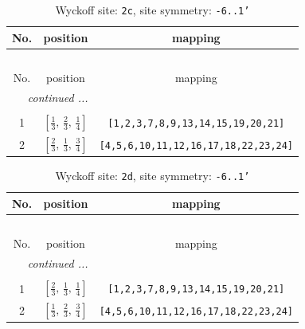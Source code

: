 \documentclass[fleqn,8pt]{jsarticle}
\begin{document}
\renewcommand{\arraystretch}{1.2}
\begin{longtable}{ccc}
\caption{Wyckoff site: {\tt 2c}, site symmetry: {\tt -6..1'}}
 \\
 \hline \hline
No. & position & mapping \\ \hline \endfirsthead

\multicolumn{2}{l}{\tablename\ \thetable{}} \\
 \hline \hline
No. & position & mapping \\ \hline \endhead

 \hline \hline
\multicolumn{2}{r}{\footnotesize\it continued ...} \\ \endfoot

 \hline \hline
\multicolumn{2}{r}{} \\ \endlastfoot

1 & $\left[ \frac{1}{3},\, \frac{2}{3},\, \frac{1}{4} \right]$ & {\tt [1,2,3,7,8,9,13,14,15,19,20,21]} \\ \hline
2 & $\left[ \frac{2}{3},\, \frac{1}{3},\, \frac{3}{4} \right]$ & {\tt [4,5,6,10,11,12,16,17,18,22,23,24]} \\
\end{longtable}
\renewcommand{\arraystretch}{1.2}
\begin{longtable}{ccc}
\caption{Wyckoff site: {\tt 2d}, site symmetry: {\tt -6..1'}}
 \\
 \hline \hline
No. & position & mapping \\ \hline \endfirsthead

\multicolumn{2}{l}{\tablename\ \thetable{}} \\
 \hline \hline
No. & position & mapping \\ \hline \endhead

 \hline \hline
\multicolumn{2}{r}{\footnotesize\it continued ...} \\ \endfoot

 \hline \hline
\multicolumn{2}{r}{} \\ \endlastfoot

1 & $\left[ \frac{2}{3},\, \frac{1}{3},\, \frac{1}{4} \right]$ & {\tt [1,2,3,7,8,9,13,14,15,19,20,21]} \\ \hline
2 & $\left[ \frac{1}{3},\, \frac{2}{3},\, \frac{3}{4} \right]$ & {\tt [4,5,6,10,11,12,16,17,18,22,23,24]} \\
\end{longtable}
\renewcommand{\arraystretch}{1.2}
\end{document}
